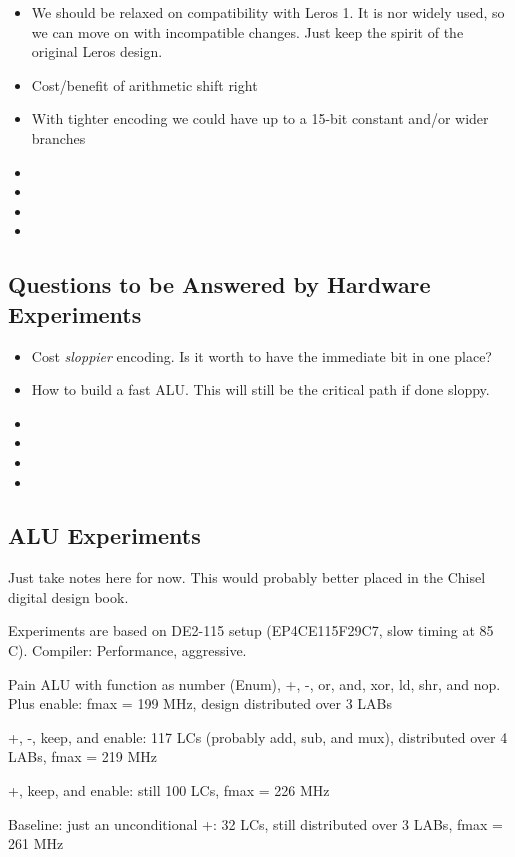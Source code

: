 \documentclass[a4paper,fontsize=10pt,twoside,DIV15,BCOR12mm,headinclude=true,footinclude=false,pagesize,bibtotoc]{scrbook}
\begin{document}
\begin{itemize}
\item We should be relaxed on compatibility with Leros 1. It is nor widely used, so we can move on
with incompatible changes. Just keep the spirit of the original Leros design.
\item Cost/benefit of arithmetic shift right
\item With tighter encoding we could have up to a 15-bit constant and/or wider branches
\item 
\item 
\item 
\item 
\end{itemize}

\subsection{Questions to be Answered by Hardware Experiments}

\begin{itemize}
\item Cost \emph{sloppier} encoding. Is it worth to have the immediate bit in one place?
\item How to build a fast ALU. This will still be the critical path if done sloppy.
\item 
\item 
\item 
\item 
\end{itemize}

\subsection{ALU Experiments}

Just take notes here for now. This would probably better placed in the Chisel digital design
book.

Experiments are based on DE2-115 setup (EP4CE115F29C7, slow timing at 85 C).
Compiler: Performance, aggressive.

Pain ALU with function as number (Enum), +, -, or, and, xor, ld, shr, and nop. Plus enable:
fmax = 199 MHz, design distributed over 3 LABs

+, -, keep, and enable: 117 LCs (probably add, sub, and mux), distributed over 4 LABs, fmax = 219 MHz

+, keep, and enable: still 100 LCs, fmax = 226 MHz

Baseline: just an unconditional +: 32 LCs, still distributed over 3 LABs, fmax = 261 MHz
\end{document}
